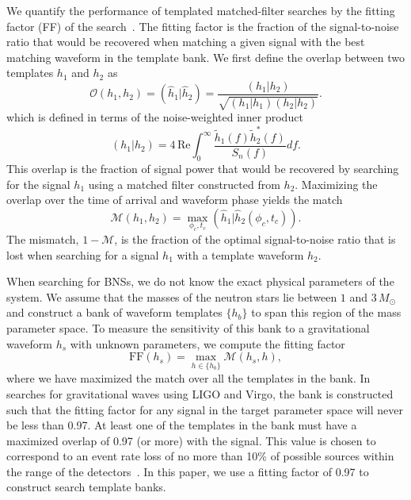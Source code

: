 We quantify the performance of templated matched-filter searches by the
fitting factor (FF) of the search~\cite{Apostolatos:1995pj}.  The fitting
factor is the fraction of the signal-to-noise ratio that would be recovered
when matching a given signal with the best matching waveform in the template
bank. We first define the overlap between two templates $h_1$ and $h_2$ as
%
\begin{equation}
\mathcal{O}(h_1,h_2) = (\hat{h}_1|\hat{h}_2) = \dfrac{(h_1|h_2)}{\sqrt{(h_1|h_1)(h_2|h_2)}}.
\end{equation}
%
which is defined in terms of the noise-weighted inner product~\cite{CF94}
%
\begin{equation}
(h_1|h_2) = 4 \, \mathrm{Re} \int^{\infty}_0\dfrac{\tilde{h}_1(f)\tilde{h}_2^*(f)}{S_n(f)} df.
\end{equation}
%
This overlap is the fraction of signal power that would be recovered by
searching for the signal $h_1$ using a matched filter constructed from $h_2$.
Maximizing the overlap over the time of arrival and waveform phase yields the
match
%
\begin{equation}
\mathcal{M}(h_1,h_2) = \underset{\phi_c,t_c}{\max}(\hat{h}_1|\hat{h}_2(\phi_c,t_c)).
\end{equation}
%
The mismatch, $1 - \mathcal{M}$, is the fraction of the optimal
signal-to-noise ratio that is lost when searching for a signal $h_1$ with
a template waveform $h_2$. 


When searching for BNSs, we do not know the exact physical parameters of the
system. We assume that the masses of the neutron stars lie between $1$ and
$3\, M_\odot$ and construct a bank of waveform templates $\{h_b\}$ to span this
region of the mass parameter space. To measure the sensitivity of this bank to
a gravitational waveform $h_s$ with unknown parameters, we compute the fitting
factor
\begin{equation}
\textrm{FF}(h_s) = \max_{h \in \{h_b\}} \mathcal{M}(h_s,h),
\end{equation}
where we have maximized the match over all the templates in the bank.  In
searches for gravitational waves using LIGO and Virgo, the bank is constructed
such that the fitting factor for any signal in the target parameter space will
never be less than 0.97. At least one of the templates in the bank must have a
maximized overlap of 0.97 (or more) with the signal. This value is chosen to
correspond to an event rate loss of no more than 10\% of possible sources
within the range of the detectors~\cite{Cutler:1992tc}. In this paper, we use
a fitting factor of 0.97 to construct search template banks.


